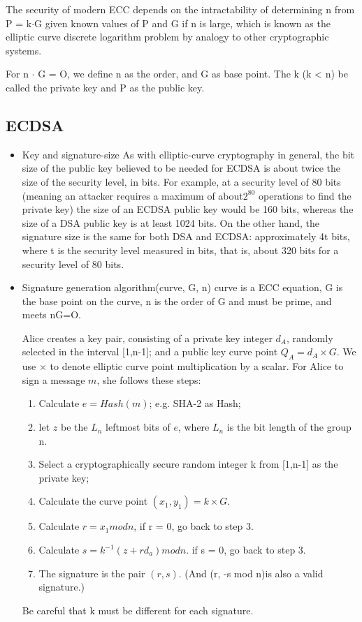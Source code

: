 \documentclass[a4paper,11pt]{article}
\begin{document}
The security of modern ECC depends on the intractability of determining n from P = k$\cdot$G given known values of P and G if n is large, which is known as the elliptic curve discrete logarithm problem by analogy to other cryptographic systems.

For n $\cdot$ G = O,  we define n as the order, and G as base point.  The k (k < n) be called the private key and P as the public key.

\subsection{ECDSA}
\begin{itemize}
\item Key and signature-size
As with elliptic-curve cryptography in general, the bit size of the public key believed to be needed for ECDSA is about twice the size of the security level, in bits. For example, at a security level of 80 bits (meaning an attacker requires a maximum of about$2^{80}$ operations to find the private key) the size of an ECDSA public key would be 160 bits, whereas the size of a DSA public key is at least 1024 bits. On the other hand, the signature size is the same for both DSA and ECDSA: approximately 4t bits, where t is the security level measured in bits, that is, about 320 bits for a security level of 80 bits.

\item Signature generation algorithm(curve, G, n)
curve is a ECC equation, G is the base point on the curve, n is the order of G and must be prime, and meets nG=O. 

Alice creates a key pair, consisting of a private key integer $d_{A}$, randomly selected in the interval [1,n-1]; and a public key curve point $Q_{A}=d_{A}\times G$. We use $\times$  to denote elliptic curve point multiplication by a scalar.
For Alice to sign a message $m$, she follows these steps:
\begin{enumerate}
\item Calculate $e = Hash(m)$; e.g.  SHA-2 as Hash;
\item let $z$ be the $L_n$ leftmost bits of $e$, where $L_n$ is the bit length of the group n.
\item Select a cryptographically secure random integer k from [1,n-1] as the private key;
\item Calculate the curve point $(x_1, y_1) = k \times G$.
\item Calculate $r = x_1 mod n$, if r = 0, go back to step 3.
\item Calculate $s = k^{-1}(z + rd_a) mod n$. if s = 0, go back to step 3.
\item The signature is the pair $(r,s)$. (And (r, -s mod n)is also a valid signature.)
\end{enumerate}
Be careful that k must be different for each signature. 


\end{itemize}
\end{document}
